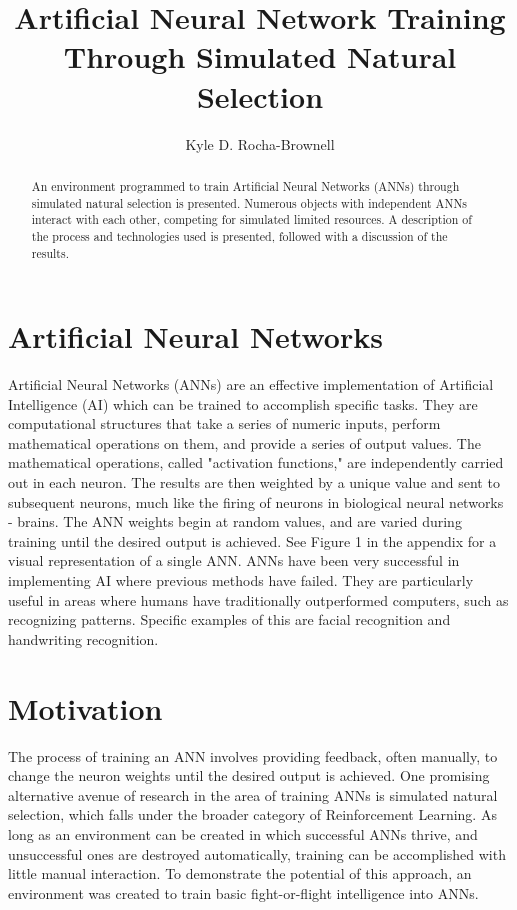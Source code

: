 \documentclass[12pt]{article} %
\title{Artificial Neural Network Training Through Simulated Natural Selection}
\author{Kyle D. Rocha-Brownell}
\affil{Departments of Physics and Computer Science}
\affil{California State University, Chico}
\date{}
\newcommand\tab[1][1cm]{\hspace*{#1}} %
\begin{document}
\maketitle
\doublespacing
\vspace{-5ex}
\begin{abstract}
An environment programmed to train Artificial Neural Networks (ANNs) through simulated natural selection is presented.  Numerous objects with independent ANNs interact with each other, competing for simulated limited resources.  A description of the process and technologies used is presented, followed with a discussion of the results.
\end{abstract}


\section{Artificial Neural Networks}
Artificial Neural Networks (ANNs) are an effective implementation of Artificial Intelligence (AI) which can be trained to accomplish specific tasks.  They are computational structures that take a series of numeric inputs, perform mathematical operations on them, and provide a series of output values.  The mathematical operations, called "activation functions," are independently carried out in each neuron. The results are then weighted by a unique value and sent to subsequent neurons, much like the firing of neurons in biological neural networks - brains. The ANN weights begin at random values, and are varied during training until the desired output is achieved.  See Figure 1 in the appendix for a visual representation of a single ANN.
\newline
\tab ANNs have been very successful in implementing AI where previous methods have failed.  They are particularly useful in areas where humans have traditionally outperformed computers, such as recognizing patterns.  Specific examples of this are facial recognition and handwriting recognition.


\section{Motivation}
The process of training an ANN involves providing feedback, often manually, to change the neuron weights until the desired output is achieved. One promising alternative avenue of research in the area of training ANNs is simulated natural selection, which falls under the broader category of Reinforcement Learning.  As long as an environment can be created in which successful ANNs thrive, and unsuccessful ones are destroyed automatically, training can be accomplished with little manual interaction.  To demonstrate the potential of this approach, an environment was created to train basic fight-or-flight intelligence into ANNs.
\end{document}
